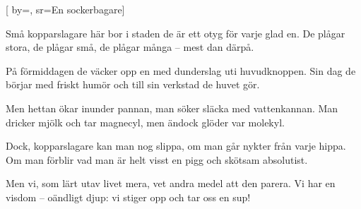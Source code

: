 [
    by={},
    sr={En sockerbagare}]

\beginverse
Små kopparslagare här bor i staden
de är ett otyg för varje glad en.
De plågar stora, de plågar små,
de plågar många – mest dan därpå.
\endverse

\beginverse
På förmiddagen de väcker opp en
med dunderslag uti huvudknoppen.
Sin dag de börjar med friskt humör
och till sin verkstad de huvet gör.
\endverse

\beginverse
Men hettan ökar inunder pannan,
man söker släcka med vattenkannan.
Man dricker mjölk och tar magnecyl,
men ändock glöder var molekyl.
\endverse

\beginverse
Dock, kopparslagare kan man nog slippa,
om man går nykter från varje hippa.
Om man förblir vad man är helt visst
en pigg och skötsam absolutist.
\endverse

\beginverse
Men vi, som lärt utav livet mera,
vet andra medel att den parera.
Vi har en visdom – oändligt djup:
vi stiger opp och tar oss en sup!
\endverse
\endsong